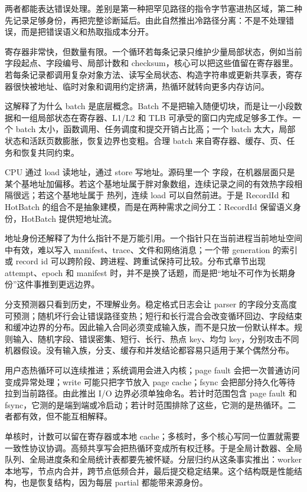 两者都能表达错误处理。差别是第一种把罕见路径的指令字节塞进热区域，第二种先记录足够身份，再把完整诊断延后。由此自然推出冷路径分离：不是不处理错误，而是把错误语义和热取指成本分开。

寄存器非常快，但数量有限。一个循环若每条记录只维护少量局部状态，例如当前字段起点、字段编号、局部计数和 checksum，核心可以把这些值留在寄存器里。若每条记录都调用复杂对象方法、读写全局状态、构造字符串或更新共享表，寄存器很快被地址、临时对象和调用约定挤满，热循环就转向更多内存访问。

这解释了为什么 batch 是底层概念。Batch 不是把输入随便切块，而是让一小段数据和一组局部状态在寄存器、L1/L2 和 TLB 可承受的窗口内完成足够多工作。一个 batch 太小，函数调用、任务调度和提交开销占比高；一个 batch 太大，局部状态和活跃页数膨胀，恢复边界也变粗。合理 batch 来自寄存器、缓存、页、任务和恢复共同约束。

CPU 通过 load 读地址，通过 store 写地址。源码里一个  字段，在机器层面只是某个基地址加偏移。若这个基地址属于胖对象数组，连续记录之间的有效热字段相隔很远；若这个基地址属于  热列，连续 load 可以自然前进。于是 RecordId 和 HotBatch 的组合不是抽象建模，而是在两种需求之间分工：RecordId 保留语义身份，HotBatch 提供短地址流。

地址身份还解释了为什么指针不是万能引用。一个指针只在当前进程当前地址空间中有效，难以写入 manifest、trace、文件和网络消息；一个带 generation 的索引或 record id 可以跨阶段、跨进程、跨重试保持可比较。分布式章节出现 attempt、epoch 和 manifest 时，并不是换了话题，而是把“地址不可作为长期身份”这件事推到更远边界。

分支预测器只看到历史，不理解业务。稳定格式日志会让 parser 的字段分支高度可预测；随机坏行会让错误路径变热；短行和长行混合会改变循环回边、字段结束和缓冲边界的分布。因此输入合同必须变成输入族，而不是只放一份默认样本。规则输入、随机字段、错误密集、短行、长行、热点 key、均匀 key，分别攻击不同机器假设。没有输入族，分支、缓存和并发结论都容易只适用于某个偶然分布。

用户态热循环可以连续推进；系统调用会进入内核；page fault 会把一次普通访问变成异常处理；write 可能只把字节放入 page cache；fsync 会把部分持久化等待拉到当前路径。由此推出 I/O 边界必须单独命名。若计时范围包含 page fault 和 fsync，它测的是端到端或冷启动；若计时范围排除了这些，它测的是热循环。二者都有效，但不能互相解释。

单核时，计数可以留在寄存器或本地 cache；多核时，多个核心写同一位置就需要一致性协议协调。高频共享写会把热循环变成所有权迁移。于是全局计数器、全局队列、全局进度条和全局统计表都要先被怀疑。分层归约从这条事实推出：worker 本地写，节点内合并，跨节点低频合并，最后提交稳定结果。这个结构既是性能结构，也是恢复结构，因为每层 partial 都能带来源身份。

